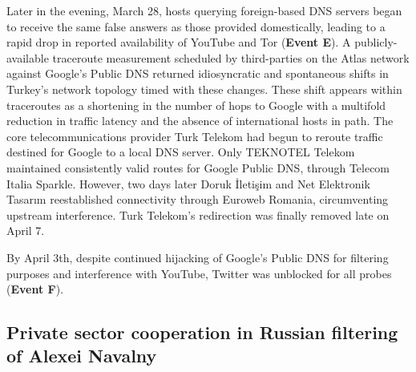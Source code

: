 Later in the evening, March 28, hosts querying foreign-based DNS servers began to
receive the same false answers as those provided domestically, leading to a
rapid drop in reported availability of YouTube and Tor (\textbf{Event E}). A
publicly-available traceroute measurement scheduled by third-parties on the Atlas network 
against Google's Public DNS returned idiosyncratic and
spontaneous shifts in Turkey's network topology timed with these
changes. These shift appears within traceroutes as a shortening in the
number of hops to Google with a multifold reduction in traffic latency and the
absence of international hosts in path. The core telecommunications provider
Turk Telekom had begun to reroute traffic destined for Google to a local DNS
server. Only TEKNOTEL Telekom maintained
consistently valid routes for Google Public DNS, through Telecom Italia
Sparkle. However, two days later Doruk \.{I}leti\c{s}im and Net Elektronik
Tasar{\i}m reestablished connectivity through Euroweb Romania, circumventing upstream interference. Turk Telekom's redirection was finally removed late on April 7.

By April 3th, despite continued hijacking of Google's Public DNS for filtering
purposes and interference with YouTube, Twitter was unblocked for all probes
(\textbf{Event F}).

\subsection{Private sector cooperation in Russian filtering of Alexei Navalny}
\label{sec:russia}


